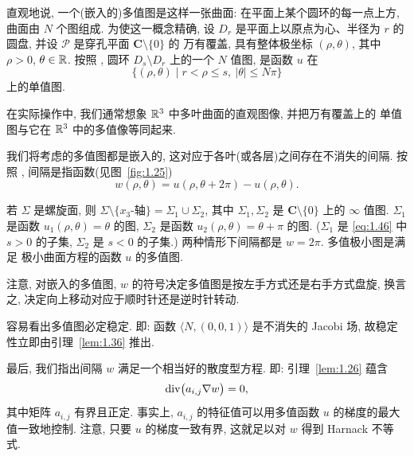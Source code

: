直观地说, 一个(嵌入的)多值图是这样一张曲面: 在平面上某个圆环的每一点上方,
曲面由 $N$ 个图组成. 为使这一概念精确, 设 $D_r$ 是平面上以原点为心、半径为
$r$ 的圆盘, 并设 $\mathcal{P}$ 是穿孔平面 $\mathbf{C}\setminus\{0\}$ 的
万有覆盖, 具有整体极坐标 $(\rho,\theta)$, 其中 $\rho>0$, $\theta\in\mathbb{R}$.
按照 \cite{CM2}, 圆环 $D_s\setminus D_r$ 上的一个 $N$ 值图, 是函数 $u$ 在
\begin{equation}
\bigl\{(\rho,\theta)\mid r<\rho\leq s,\ |\theta|\leq N\pi\bigr\}
\label{eq:1.202}
\end{equation}
上的单值图.

在实际操作中, 我们通常想象 $\mathbb{R}^3$ 中多叶曲面的直观图像, 并把万有覆盖上的
单值图与它在 $\mathbb{R}^3$ 中的多值像等同起来.


我们将考虑的多值图都是嵌入的, 这对应于各叶(或各层)之间存在不消失的间隔.
按照 \cite{CM2}, 间隔是指函数(见图~\ref{fig:1.25})
\begin{equation}
w(\rho,\theta)=u(\rho,\theta+2\pi)-u(\rho,\theta).
\label{eq:1.203}
\end{equation}


若 $\Sigma$ 是螺旋面, 则
$\Sigma\setminus\{x_3\text{-轴}\}=\Sigma_1\cup\Sigma_2$, 其中
$\Sigma_1,\Sigma_2$ 是 $\mathbf{C}\setminus\{0\}$ 上的 $\infty$ 值图.
$\Sigma_1$ 是函数 $u_1(\rho,\theta)=\theta$ 的图, $\Sigma_2$ 是函数
$u_2(\rho,\theta)=\theta+\pi$ 的图. ($\Sigma_1$ 是 \eqref{eq:1.46} 中 $s>0$ 的子集,
$\Sigma_2$ 是 $s<0$ 的子集.) 两种情形下间隔都是 $w=2\pi$. 多值极小图是满足
极小曲面方程的函数 $u$ 的多值图.

注意, 对嵌入的多值图, $w$ 的符号决定多值图是按左手方式还是右手方式盘旋,
换言之, 决定向上移动对应于顺时针还是逆时针转动.

容易看出多值图必定稳定. 即: 函数 $\langle N,(0,0,1)\rangle$ 是不消失的
Jacobi 场, 故稳定性立即由引理~\ref{lem:1.36} 推出.

最后, 我们指出间隔 $w$ 满足一个相当好的散度型方程. 即: 引理~\ref{lem:1.26}
蕴含
\begin{equation}
\operatorname{div}\bigl(a_{i,j}\nabla w\bigr)=0,
\label{eq:1.204}
\end{equation}
其中矩阵 $a_{i,j}$ 有界且正定. 事实上, $a_{i,j}$ 的特征值可以用多值函数
$u$ 的梯度的最大值一致地控制. 注意, 只要 $u$ 的梯度一致有界, 这就足以对
$w$ 得到 Harnack 不等式.

